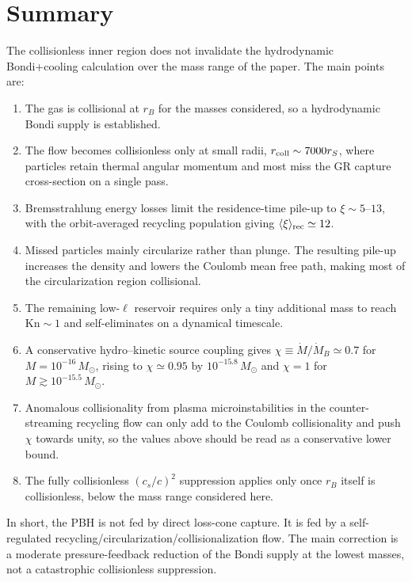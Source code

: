 \documentclass[12pt]{article}
\newcommand{\Msun}{M_\odot}
\newcommand{\Mdot}{\dot{M}}
\newcommand{\MdotB}{\dot{M}_B}
\newcommand{\rcoll}{r_{\rm coll}}
\newcommand{\Kn}{\mathrm{Kn}}
\begin{document}
\section{Summary}
\label{app:summary}

The collisionless inner region does not invalidate the hydrodynamic
Bondi+cooling calculation over the mass range of the paper. The main
points are:
\begin{enumerate}
  \item The gas is collisional at $r_B$ for the masses considered, so a
  hydrodynamic Bondi supply is established.
  \item The flow becomes collisionless only at small radii,
  $\rcoll\sim7000r_S$, where particles retain thermal angular momentum
  and most miss the GR capture cross-section on a single pass.
  \item Bremsstrahlung energy losses limit the residence-time pile-up to
  $\xi\sim5$--$13$, with the orbit-averaged recycling population giving
  $\langle\xi\rangle_{\rm rec}\simeq12$.
  \item Missed particles mainly circularize rather than plunge. The
  resulting pile-up increases the density and lowers the Coulomb mean
  free path, making most of the circularization region collisional.
  \item The remaining low-$\ell$ reservoir requires only a tiny
  additional mass to reach $\Kn\sim1$ and self-eliminates on a dynamical
  timescale.
  \item A conservative hydro--kinetic source coupling gives
  $\chi\equiv\Mdot/\MdotB\simeq0.7$ for $M=10^{-16}\,\Msun$, rising to
  $\chi\simeq0.95$ by $10^{-15.8}\,\Msun$ and $\chi=1$ for
  $M\gtrsim10^{-15.5}\,\Msun$.
  \item Anomalous collisionality from plasma microinstabilities in the
  counter-streaming recycling flow can only add to the Coulomb
  collisionality and push $\chi$ towards unity, so the values above
  should be read as a conservative lower bound.
  \item The fully collisionless $(c_s/c)^2$ suppression applies only
  once $r_B$ itself is collisionless, below the mass range considered
  here.
\end{enumerate}

In short, the PBH is not fed by direct loss-cone capture. It is fed by
a self-regulated recycling/circularization/collisionalization flow. The
main correction is a moderate pressure-feedback reduction of the Bondi
supply at the lowest masses, not a catastrophic collisionless
suppression.
\end{document}
